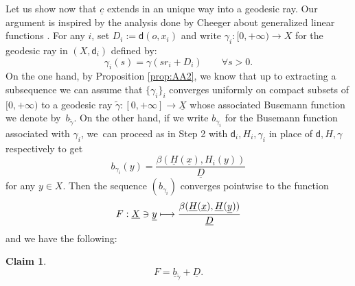 \documentclass[10pt]{amsart}
\newcommand\mto{\mathchoice{\longmapsto}{\mapsto}{\mapsto}{\mapsto}}
\theoremstyle{plain}
\newtheorem{claim}[theorem]{Claim}
\theoremstyle{definition}
\newcommand{\dist}{\mathsf{d}}
\newcommand{\uX}{\underline{X}}
\newcommand{\ux}{\underline{x}}
\newcommand{\uc}{\underline{c}}
\newcommand{\uD}{\underline{D}}
\newcommand{\uH}{\underline{H}}
\newcommand{\uy}{\underline{y}}
\begin{document}
Let us show now that $\uc$ extends in an unique way into a geodesic ray. Our argument is inspired by the analysis done by Cheeger about generalized linear functions \cite[\S 8]{CheegerRademacher}. For any $i$, set $D_i:=\dist(o,x_i)$ and write $\gamma_i:[0,+\infty) \to X$ for the geodesic ray in $(X,\dist_i)$ defined by:
\[
\gamma_i(s) = \gamma(sr_i + D_i) \qquad \forall s>0.
\]
On the one hand, by Proposition \ref{prop:AA2}, we know that up to extracting a subsequence we can assume that $\{\gamma_i\}_i$ converges uniformly on compact subsets of $[0,+\infty)$ to a geodesic ray $\tilde{\gamma}:[0,+\infty] \to \uX$ whose associated Busemann function we denote by~$b_{\tilde{\gamma}}$. On the other hand, if we write $b_{\gamma_i}$ for the Busemann function associated with $\gamma_i$, we~can proceed as in Step 2 with $\dist_{i}, H_{i},\gamma_{i}$ in place of $\dist, H, \gamma$ respectively to get
\begin{equation}
b_{\gamma_{i}}(y) = \frac{\beta(\uH(\ux),H_{i}(y))}{\uD}
\end{equation}
for any $y \in X$. Then the sequence $(b_{\gamma_i})$ converges pointwise to the function
\[
F:\uX \ni \uy \mto \frac{\beta(\uH(\ux),\uH(\uy))}{\uD}
\]
and we have the following:

\skpt
\begin{claim}\mbox{}\vspace*{-1.2\baselineskip}
\begin{equation}\label{eq:uniqueness}
F=\underline{b}_{\tilde{\gamma}}+\uD.
\end{equation}
\end{claim}
\end{document}
